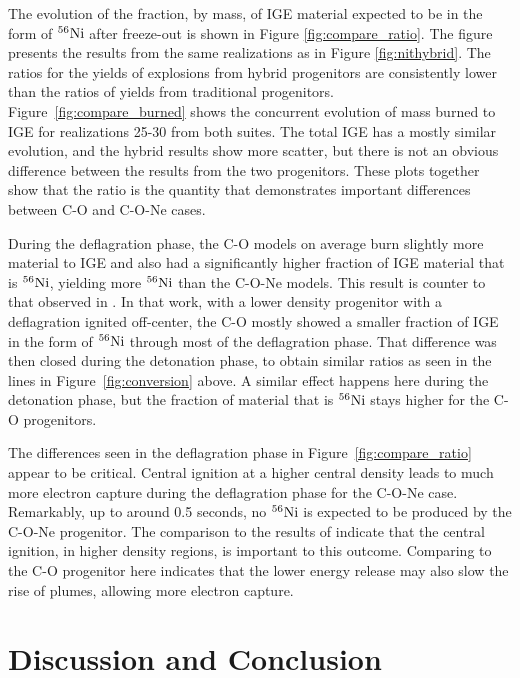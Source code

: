 \documentclass[preprint2]{aastex63}
\newcommand{\Ni}[1]{\ensuremath{{}^{#1}{\rm Ni}}}
\begin{document}
{\color{blue} 
The evolution of the fraction, by mass, of IGE material expected to be in the form of \Ni{56} after 
freeze-out is shown in Figure \ref{fig:compare_ratio}. The figure presents the results from the
same realizations as in Figure \ref{fig:nithybrid}. The ratios for the yields of 
explosions from hybrid progenitors are consistently lower than the ratios of yields from
traditional progenitors.
Figure~\ref{fig:compare_burned} shows the 
concurrent evolution of mass burned to IGE for realizations 25-30 from both suites.
The total IGE has a mostly similar evolution, and the hybrid results show
more scatter, but there is not an obvious difference between the results from
the two progenitors. These plots together show that the 
ratio is the quantity that demonstrates important differences between 
C-O and C-O-Ne cases.
}

During the deflagration phase, the C-O models
on average burn slightly more material to IGE and also had a significantly higher
fraction of IGE material that is \Ni{56}, yielding more \Ni{56} than
the C-O-Ne models. This result is counter to that observed in
\citet{willcoxetal2016}.
In that work, with a lower density progenitor with a deflagration ignited off-center, the C-O mostly showed a smaller fraction of IGE in the form of \Ni{56} through most of the deflagration phase.
That difference was then closed during the detonation phase, to obtain similar ratios as seen in the lines in Figure~\ref{fig:conversion} above.
A similar effect happens here during the detonation phase, but the fraction of material that is \Ni{56} stays higher for the C-O progenitors.

The differences seen in the deflagration phase in Figure~\ref{fig:compare_ratio} appear to be critical.
Central ignition at a higher central density leads to much more electron capture during the deflagration phase for the C-O-Ne case.
Remarkably, up to around 0.5 seconds, no \Ni{56} is expected to be produced by the C-O-Ne progenitor.
The comparison to the results of \citep{willcoxetal2016} indicate that the central ignition, in higher density regions, is important to this outcome.
Comparing to the C-O progenitor here indicates that the lower energy release may also slow the rise of plumes, allowing more electron capture.

\section{Discussion and Conclusion}
\end{document}
